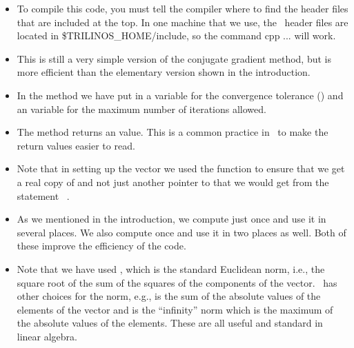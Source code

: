 
\begin{itemize}
  \item To compile this code, you must tell the compiler where to find
the header files that are included at the top.  In one machine that we
use, the \tri\ header files are located in \$TRILINOS\_HOME/include, so
the command 
\bdcode
cpp ...
\edcode
will work.
  \item This is still a very simple version of the conjugate gradient
method, but is more efficient than the elementary version shown in the
introduction.
  \item In the  method we have put in a 
variable for the convergence tolerance () and an
 variable for the maximum number of iterations allowed.
  \item The  method returns an  value.  This is
a common practice in \cpp\ to make the return values easier to read.
  \item Note that in setting up the vector  we used the
 function to ensure that we get a real copy of 
and not just another pointer to  that we would get from the
statement \ .
  \item As we mentioned in the introduction, we compute 
just once and use it in several places.  We also compute  once and use it in two places as well.  Both of these improve
the efficiency of the code.
  \item Note that we have used , which is the standard
Euclidean norm, i.e., the square root of the sum of the squares of the
components of the vector. \thyra\ has other choices for the norm,
e.g.,  is the sum of the absolute values of the
elements of the vector and  is the ``infinity'' norm
which is the maximum of the absolute values of the elements.  These
are all useful and standard in linear algebra.
\end{itemize}


 
